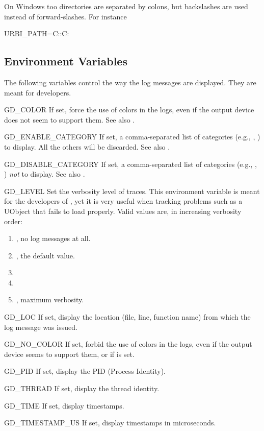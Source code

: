 \begin{windows}
  On Windows too directories are separated by colons, but backslashes
  are used instead of forward-slashes.  For instance
\begin{shell}
URBI_PATH=C:\cygwin\home\jessie\urbi:C:\cygwin\usr\local\urbi
\end{shell}
\end{windows}

\subsection{Environment Variables}
\label{sec:tools:env}

The following variables control the way the log messages are displayed.
They are meant for developers.
\begin{envs}
\item[GD\_COLOR] If set, force the use of colors in the logs, even if the
  output device does not seem to support them.  See also .
\item[GD\_ENABLE\_CATEGORY] If set, a comma-separated list of categories
  (e.g., , ) to display.  All the others will be
  discarded.  See also .
\item[GD\_DISABLE\_CATEGORY] If set, a comma-separated list of categories
  (e.g., , ) \emph{not} to display.  See also
  .
\item[GD\_LEVEL] Set the verbosity level of traces.  This environment
  variable is meant for the developers of \usdk, yet it is very useful
  when tracking problems such as a UObject that fails to load properly.
  Valid values are, in increasing verbosity order:
  \begin{enumerate}
  \item {}, no log messages at all.
  \item {}, the default value.
  \item {}
  \item {}
  \item {}, maximum verbosity.
  \end{enumerate}

\item[GD\_LOC] If set, display the location (file, line, function name) from
  which the log message was issued.

\item[GD\_NO\_COLOR] If set, forbid the use of colors in the logs, even if
  the output device seems to support them, or if  is set.

\item[GD\_PID] If set, display the PID (Process Identity).

\item[GD\_THREAD] If set, display the thread identity.

\item[GD\_TIME] If set, display timestamps.

\item[GD\_TIMESTAMP\_US] If set, display timestamps in microseconds.
\end{envs}

